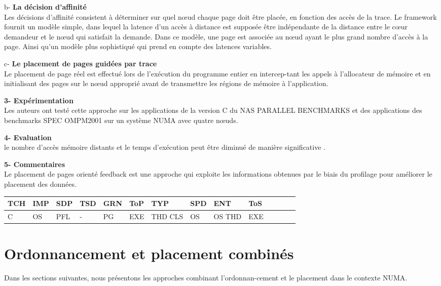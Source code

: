 b- \textbf{La décision d'affinité}\\
Les décisions d'affinité consistent à déterminer sur quel nœud chaque page doit être placée, en fonction des accès de la trace. 
Le framework fournit un modèle simple, dans lequel la latence d'un accès à distance est supposée être indépendante de la distance entre le cœur demandeur et le nœud qui satisfait la demande. Dans ce modèle, une page est associée au nœud ayant le plus grand nombre d'accès à la page. Ainsi qu'un modèle plus sophistiqué qui prend en compte des latences variables. 

c- \textbf{Le placement de pages guidées par trace}\\
Le placement de page réel est effectué lors de l'exécution du programme entier en intercep-tant les appels à l'allocateur de mémoire et en initialisant des pages sur le nœud approprié avant de transmettre les régions de mémoire à l'application. 

\textbf{3- Expérimentation}\\
Les auteurs ont testé cette approche sur les applications de la version C du NAS PARALLEL BENCHMARKS et des applications des benchmarks SPEC OMPM2001 sur un système NUMA avec quatre nœuds.

\textbf{4- Evaluation}\\
le nombre d'accès mémoire distants et le temps d'exécution peut être diminué de manière significative . 

\textbf{5- Commentaires}\\
Le placement de pages orienté feedback est une approche qui exploite les informations obtenues par le biais du profilage pour améliorer le placement des données. 
%
\begin{center}%
\begin{tabular}{l *{13}{l}} 		\hline
{TCH} & {IMP} 	& {SDP} 	&  {TSD} 	& {GRN} 	& {ToP} 	& {TYP} 	& {SPD}	& {ENT} 	& {ToS} \\     		\hline
C     	& OS		& PFL		&  - 		& PG		& EXE		& THD CLS	& OS 		& OS THD  & EXE  \\     		          \hline
\end{tabular}
\end{center}
\section{Ordonnancement et placement combinés}\label{ordoPlaceComb}
%
Dans les sections suivantes, nous présentons les approches combinant l'ordonnan-cement et le placement dans le contexte NUMA.  
%
